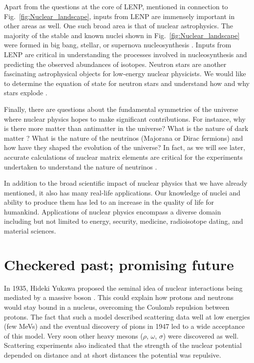 	Apart from the questions at the core of LENP, mentioned in connection to
	Fig.~\ref{fig:Nuclear_landscape}, inputs from LENP are immensely important
	in other areas as well.  One such broad area is that of nuclear astrophysics.
	The majority of the stable
	and known nuclei shown in Fig.~\ref{fig:Nuclear_landscape} were formed in
	big bang, stellar, or supernova nucleosynthesis
	\cite{Cyburt:2015mya, PAS:9305903}.  Inputs from LENP are
	critical in understanding the processes involved in nucleosynthesis and
	predicting the observed abundances of isotopes.
	Neutron stars are another fascinating astrophysical objects for low-energy
	nuclear physicists.  We would like to determine the equation of state for
	neutron stars and understand how and why stars explode
	\cite{Lattimer:2015eaa}.

	Finally, there are questions about the fundamental symmetries of the universe
	where
	nuclear physics hopes to make significant contributions.  For instance,
	why is there more matter than antimatter in the universe?  What is the nature
	of dark matter \cite{Feng:2010gw}?  What is the nature of the neutrinos
	(Majorana or Dirac
	fermions) and how have they shaped the evolution of the universe?
	In fact, as we will see later, accurate calculations of nuclear matrix
	elements are critical for the experiments undertaken to understand the
	nature of neutrinos \cite{Avignone:2007fu}.

	In addition to the broad scientific impact of nuclear physics that we have
	already mentioned, it also has many real-life applications.  Our knowledge of
	nuclei and ability to produce them has led to an increase in the quality of
	life
	for humankind.  Applications of nuclear physics encompass a diverse
	domain including but not limited to energy, security, medicine,
	radioisotope dating, and material sciences.


	\section{Checkered past; promising future}

	In 1935, Hideki Yukawa proposed the seminal idea of nuclear interactions
	being mediated by a massive boson \cite{Yukawa:1935xg}.   This could explain
	how protons and neutrons would stay bound in a nucleus, overcoming the Coulomb
	repulsion between protons.  The fact that such a model described scattering
	data well at low energies (few MeVs) and the eventual discovery of pions in
	1947 led to a wide acceptance of this model.  Very soon other heavy mesons
	($\rho$, $\omega$, $\sigma$) were discovered as well.  Scattering experiments
	also indicated that the strength of the nuclear potential depended on
	distance and at short distances the potential was repulsive.

